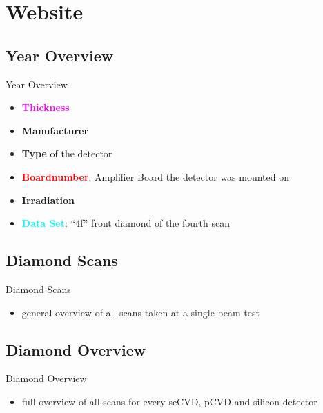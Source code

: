 \section{Website}
\subsection{Year Overview}
\begin{frame}{Year Overview}


	\begin{itemize}\itemfill
		\item \textcolor{Magenta}{\textbf{Thickness}}
		\item \textcolor{RedOrange}{\textbf{Manufacturer}}
		\item \textcolor{green!30!black}{\textbf{Type}} of the detector
		\item \textcolor{red}{\textbf{Boardnumber}}: Amplifier Board the detector was mounted on
		\item \textcolor{blue!30!black}{\textbf{Irradiation}}
		\item \textcolor{cyan}{\textbf{Data Set}}: ``4f'' front diamond of the fourth scan
		
	\end{itemize}
	
\end{frame}

\subsection{Diamond Scans}
\begin{frame}{Diamond Scans}
	
	\begin{itemize}
		\item general overview of all scans taken at a single beam test
	\end{itemize}
	
	
\end{frame}
\subsection{Diamond Overview}
\begin{frame}{Diamond Overview}
	
	\begin{itemize}
		\item full overview of all scans for every scCVD, pCVD and silicon detector  
	\end{itemize}
	
	
\end{frame}
